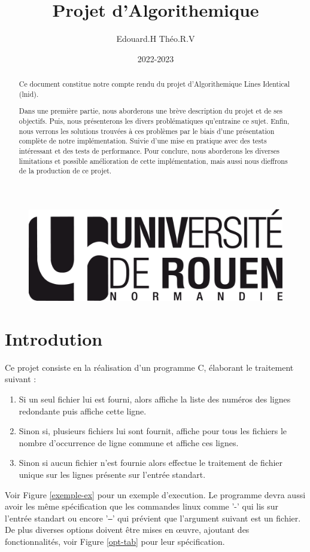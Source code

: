 \documentclass[12pt]{article}
\title{Projet d'Algorithemique}
\author{Edouard.H Théo.R.V}
\date{2022-2023}
\begin{document}
    \begin{figure}
        \includegraphics[scale=0.3, right]{logo-univ-rouen-normandie-noir.png}
    \end{figure}
    
    \maketitle

    \begin{abstract}
        Ce document constitue notre compte rendu du projet d'Algorithemique Lines Identical (lnid).

        Dans une première partie, nous aborderons une brève description du projet et de ses objectifs.     
        Puis, nous présenterons les divers problématiques qu'entraine ce sujet.
        Enfin, nous verrons les solutions trouvées à ces problèmes par le biais d'une présentation complète de notre implémentation. Suivie d'une mise en pratique avec des tests intéressant et des tests de performance. Pour conclure, nous aborderons les diverses limitations et possible amélioration de cette implémentation, mais aussi nous dieffrons de la production de ce projet.
    \end{abstract}

    \tableofcontents
    
    \newpage

    \section{Introdution}
        Ce projet consiste en la réalisation d'un programme C, élaborant le traitement suivant : 
        \begin{enumerate}
            \item[] Si un seul fichier lui est fourni, alors affiche la liste des numéros des lignes redondante puis affiche cette ligne.
            \item[] Sinon si, plusieurs fichiers lui sont fournit, affiche pour tous les fichiers le nombre d'occurrence de ligne commune et affiche ces lignes.
            \item[] Sinon si aucun fichier n'est fournie alors effectue le traitement de fichier unique sur les lignes présente sur l'entrée standart.
        \end{enumerate}
        Voir Figure \ref{exemple-ex} pour un exemple d'execution. Le programme devra aussi avoir les même spécification que les commandes linux comme '-' qui lis sur l'entrée standart ou encore '\texttt{--}' qui prévient que l'argument suivant est un fichier.
       De plus diverses options doivent être mises en œuvre, ajoutant des fonctionnalités, voir Figure \ref{opt-tab} pour leur spécification.
       
\end{document}
